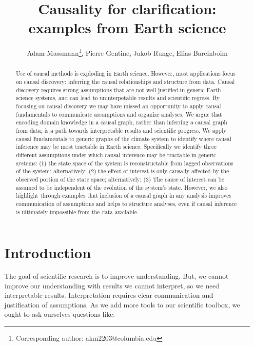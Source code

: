 \documentclass[12pt]{article}
\begin{document}
\title{Causality for clarification: examples from Earth science}

\author{Adam Massmann\thanks{Corresponding author:
    akm2203@columbia.edu}, Pierre Gentine, Jakob Runge, Elias Bareinboim}

\maketitle
\begin{abstract}
  Use of causal methods is exploding in Earth science. However, most
  applications focus on causal discovery: inferring the causal
  relationships and structure from data. Causal discovery requires
  strong assumptions that are not well justified in generic Earth
  science systems, and can lead to uninterpetable results and
  scientific regress. By focusing on causal discovery we may have
  missed an opportunity to apply causal fundamentals to communicate
  assumptions and organize analyses. We argue that encoding domain
  knowledge in a causal graph, rather than inferring a causal graph
  from data, is a path towards interpretable results and scientific
  progress. We apply causal fundamentals to generic graphs of the
  climate system to identify where causal inference may be most
  tractable in Earth science. Specifically we identify three different
  assumptions under which causal inference may be tractable in generic
  systems: (1) the state space of the system is reconstructable from
  lagged observations of the system; alternatively: (2) the effect of
  interest is only causally affected by the observed portion of the
  state space; alternatively: (3) The cause of interest can be assumed
  to be independent of the evolution of the system’s state. However,
  we also highlight through examples that inclusion of a causal graph
  in any analysis improves communication of assumptions and helps to
  structure analyses, even if causal inference is ultimately
  impossible from the data available.

\end{abstract}

\section{Introduction}


The goal of scientific research is to improve understanding. But, we
cannot improve our understanding with results we cannot interpret, so
we need interpretable results. Interpretation requires clear
communication and justification of assumptions. As we add more tools
to our scientific toolbox, we ought to ask ourselves questions like:
\end{document}
